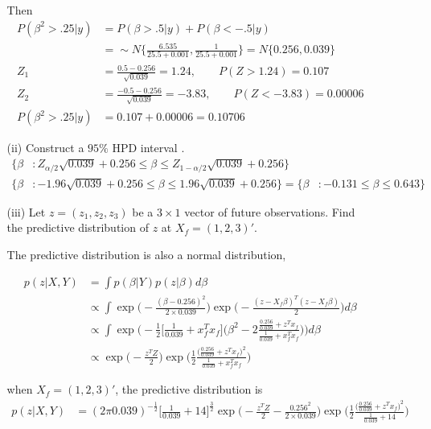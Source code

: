 \begin{itemize}
\begin{itemize}
Then 
\begin{align*}
P(\beta^2 > .25| y) &=  P(\beta > .5| y) + P(\beta < -.5| y) \\
&= \sim N \{ \frac{6.535}{25.5 + 0.001}, \frac{1}{25.5+0.001} \}  = N \{ 0.256, 0.039 \} \\
Z_{1} &= \frac{0.5 - 0.256}{\sqrt{0.039}} = 1.24, \qquad P(Z > 1.24) = 0.107\\
Z_{2} &= \frac{-0.5 - 0.256}{\sqrt{0.039}} = -3.83, \qquad P(Z < -3.83) = 0.00006\\
P(\beta^2 > .25| y) &= 0.107 + 0.00006 = 0.10706
\end{align*}

\item[(ii)] Construct a $95\%$ HPD interval .
\begin{align*}
\Bigg \{\beta &: Z_{\alpha/2} \sqrt{0.039} + 0.256 \leq \beta \leq  Z_{1-\alpha/2} \sqrt{0.039} + 0.256 \Bigg \} \\
\Bigg \{\beta &: -1.96 \sqrt{0.039} + 0.256 \leq \beta \leq  1.96 \sqrt{0.039} + 0.256 \Bigg \} = \Bigg \{\beta &: -0.131 \leq \beta \leq  0.643 \Bigg \}
\end{align*}

\item[(iii)] Let $z = (z_1, z_2, z_3)$ be a $3 \times 1$ vector of future observations. Find the predictive distribution of $z$ at $X_f = (1,2,3)'$.

The predictive distribution is also a normal distribution, 

\begin{align*}
p(z| X, Y) &= \int p(\beta | Y) p(z| \beta) d\beta \\
& \propto \int  \exp \Big(-\frac{(\beta - 0.256)^2}{2 \times 0.039} \Big) \exp \Big(- \frac{ (z- X_f \beta)^T (z- X_f \beta)}{2} \Big) d\beta \\
& \propto \int \exp \Big(-\frac{1}{2} \Big[ \frac{1}{0.039} + x_f^T x_f \Big] \Big( \beta^2 - 2\frac{\frac{0.256}{0.039} + z^T x_f}{\frac{1}{0.039} + x_f^T x_f } \Big ) \Big) d\beta \\
&\propto \exp \Big(-\frac{z^TZ}{2}  \Big) \exp \Big(\frac{1}{2} \frac{\Big(\frac{0.256}{0.039} + z^T x_f \Big)^2}{\frac{1}{0.039} + x_f^T x_f } \Big) 
\end{align*}

when $X_f = (1,2,3)'$, the predictive distribution is 
\begin{align*}
p(z| X, Y) &=  (2\pi 0.039)^{-\frac{1}{2}} \Big[ \frac{1}{0.039} + 14 \Big]^{\frac{3}{2}} \exp \Big(-\frac{z^TZ}{2} - \frac{0.256^2}{2 \times 0.039} \Big) \exp \Big(\frac{1}{2} \frac{\Big(\frac{0.256}{0.039} + z^T x_f \Big)^2}{\frac{1}{0.039} + 14} \Big) 
\end{align*}


\end{itemize}
\end{itemize}
